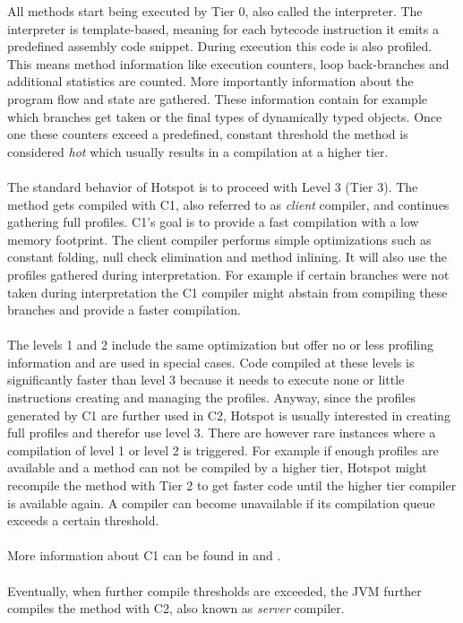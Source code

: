 All methods start being executed by Tier 0, also called the interpreter.
The interpreter is template-based, meaning for each bytecode instruction it emits a predefined assembly code snippet.
During execution this code is also profiled. This means method information like execution counters, loop back-branches and additional statistics are counted. More importantly information about the program flow and state are gathered. These information contain for example which branches get taken or the final types of dynamically typed objects. Once one these counters exceed a predefined, constant threshold the method is considered \textit{hot} which usually results in a compilation at a higher tier.
\\\\
The standard behavior of Hotspot is to proceed with Level 3 (Tier 3). The method gets compiled with C1, also referred to as \textit{client} compiler, and continues gathering full profiles.
C1's goal is to provide a fast compilation with a low memory footprint.
The client compiler performs simple optimizations such as constant folding, null check elimination and method inlining.
It will also use the profiles gathered during interpretation. For example if certain branches were not taken during interpretation the C1 compiler might abstain from compiling these branches and provide a faster compilation.
\\\\
The levels 1 and 2 include the same optimization but offer no or less profiling information and are used in special cases. Code compiled at these levels is significantly faster than level 3 because it needs to execute none or little instructions creating and managing the profiles. Anyway, since the profiles generated by C1 are further used in C2, Hotspot is usually interested in creating full profiles and therefor use level 3.
There are however rare instances where a compilation of level 1 or level 2 is triggered. For example if enough profiles are available and a method can not be compiled by a higher tier, Hotspot might recompile the method with Tier 2 to get faster code until the higher tier compiler is available again. A compiler can become unavailable if its compilation queue exceeds a certain threshold.
\\\\
More information about C1 can be found in \cite{client_compiler_talk} and \cite{client_compiler}.
\\\\
Eventually, when further compile thresholds are exceeded, the JVM further compiles the method with C2, also known as \textit{server} compiler.
